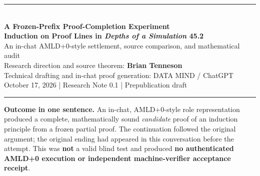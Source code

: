 \documentclass[11pt,letterpaper]{article}
\begin{document}
\thispagestyle{empty}
\begin{center}
{\color{navy}\rule{\linewidth}{1.3pt}}\\[0.65em]
{\LARGE\bfseries A Frozen-Prefix Proof-Completion Experiment}\\[0.45em]
{\Large\bfseries Induction on Proof Lines in \emph{Depths of a Simulation} 45.2}\\[0.7em]
{\large An in-chat AMLD+0-style settlement, source comparison, and mathematical audit}\\[0.65em]
{\normalsize Research direction and source theorem: \textbf{Brian Tenneson}}\\[0.3em]
{\small Technical drafting and in-chat proof generation: DATA MIND / ChatGPT}\\[0.3em]
{\small October 17, 2026 \quad | \quad Research Note 0.1 \quad | \quad Prepublication draft}
\\[0.65em]
{\color{navy}\rule{\linewidth}{0.7pt}}
\end{center}
\begin{resultbox}
\textbf{Outcome in one sentence.} An in-chat, AMLD+0-style role representation produced a complete, mathematically sound \emph{candidate} proof of an induction principle from a frozen partial proof. The continuation followed the original argument; the original ending had appeared in this conversation before the attempt. This was \textbf{not} a valid blind test and produced \textbf{no authenticated AMLD+0 execution or independent machine-verifier acceptance receipt}.
\end{resultbox}
\end{document}
